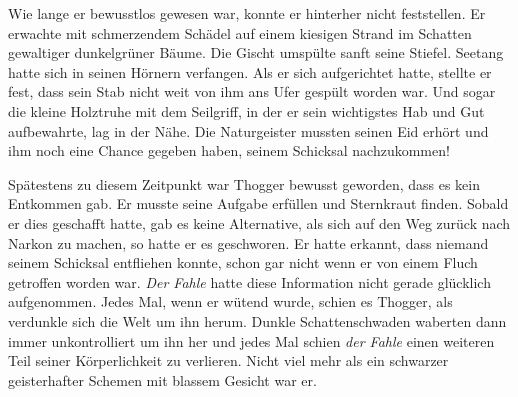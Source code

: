 \documentclass[10pt, a4paper, oneside]{book}
\begin{document}
\begin{multicols}{2}
Wie lange er bewusstlos gewesen war, konnte er hinterher nicht feststellen. Er erwachte mit schmerzendem Schädel auf einem kiesigen Strand im Schatten gewaltiger dunkelgrüner Bäume. Die Gischt umspülte sanft seine Stiefel. Seetang hatte sich in seinen Hörnern verfangen. Als er sich aufgerichtet hatte, stellte er fest, dass sein Stab nicht weit von ihm ans Ufer gespült worden war. Und sogar die kleine Holztruhe mit dem Seilgriff, in der er sein wichtigstes Hab und Gut aufbewahrte, lag in der Nähe. Die Naturgeister mussten seinen Eid erhört und ihm noch eine Chance gegeben haben, seinem Schicksal nachzukommen!\bigskip

Spätestens zu diesem Zeitpunkt war Thogger bewusst geworden, dass es kein Entkommen gab. Er musste seine Aufgabe erfüllen und Sternkraut finden. Sobald er dies geschafft hatte, gab es keine Alternative, als sich auf den Weg zurück nach Narkon zu machen, so hatte er es geschworen. Er hatte erkannt, dass niemand seinem Schicksal entfliehen konnte, schon gar nicht wenn er von einem Fluch getroffen worden war. \textit{Der Fahle} hatte diese Information nicht gerade glücklich aufgenommen. Jedes Mal, wenn er wütend wurde, schien es Thogger, als verdunkle sich die Welt um ihn herum. Dunkle Schattenschwaden waberten dann immer unkontrolliert um ihn her und jedes Mal schien \textit{der Fahle} einen weiteren Teil seiner Körperlichkeit zu verlieren. Nicht viel mehr als ein schwarzer geisterhafter Schemen mit blassem Gesicht war er.\bigskip


\end{multicols}
\end{document}
